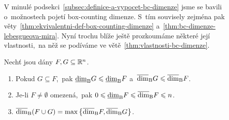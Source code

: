 V minulé podsekci~\ref{subsec:definice-a-vypocet-bc-dimenze} jsme se bavili o~možnostech pojetí box-counting dimenze. S~tím souvisely zejména pak věty~\ref{thm:ekvivalentni-def-box-counting-dimenze} a~\ref{thm:bc-dimenze-lebesgueova-mira}. Nyní trochu blíže ještě prozkoumáme některé její vlastnosti,~na něž se podíváme ve větě~\ref{thm:vlastnosti-bc-dimenze}.
\begin{theorem}\label{thm:vlastnosti-bc-dimenze}
    Nechť jsou dány $F,G\subseteq\mathbb{R}^n$.
    \begin{enumerate}[label=(\roman*)]
        \item\label{thm:monotonie-bc-dimenze} Pokud $G\subseteq F$,~pak $\underline{\dim}_\textup{B}{G}\leqslant\underline{\dim}_\textup{B}{F}$ a~$\overline{\dim}_\textup{B}{G}\leqslant\overline{\dim}_\textup{B}{F}$.
        \item\label{thm:rozsah-hodnot-bc-dimenze} Je-li $F\neq\emptyset$ omezená,~pak $0\leqslant\underline{\dim}_\textup{B}{F}\leqslant\overline{\dim}_\textup{B}{F}\leqslant n$.
        \item\label{thm:stabilita-bc-dimenze} $\overline{\dim}_\textup{B}(F\cup G)=\max\left\{\overline{\dim}_\textup{B}{F},\overline{\dim}_\textup{B}{G}\right\}$.
    \end{enumerate}
\end{theorem}
